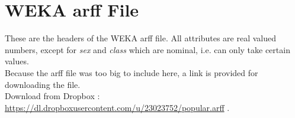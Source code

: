 \documentclass[12pt,twocolumn,a4paper]{article}
\begin{document}
\pagebreak
\onecolumn

\appendix
\section{WEKA arff File}
These are the headers of the WEKA arff file. All attributes are real valued numbers, except for \textit{sex} and \textit{class} which are nominal, i.e. can only take certain values.\\

Because the arff file was too big to include here, a link is provided for downloading the file. \\

Download from Dropbox : \href{https://dl.dropboxusercontent.com/u/23023752/popular.arff}{https://dl.dropboxusercontent.com/u/23023752/popular.arff} .
\label{sec:arff}
%
\end{document}
